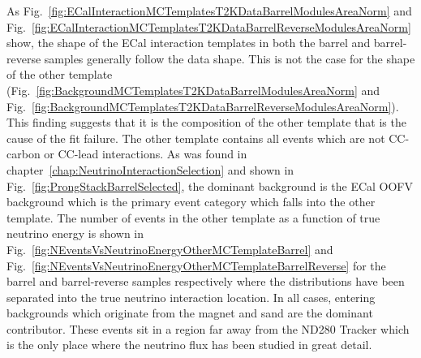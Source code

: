 As Fig.~\ref{fig:ECalInteractionMCTemplatesT2KDataBarrelModulesAreaNorm} and Fig.~\ref{fig:ECalInteractionMCTemplatesT2KDataBarrelReverseModulesAreaNorm} show, the shape of the ECal interaction templates in both the barrel and barrel-reverse samples generally follow the data shape.  This is not the case for the shape of the other template (Fig.~\ref{fig:BackgroundMCTemplatesT2KDataBarrelModulesAreaNorm} and Fig.~\ref{fig:BackgroundMCTemplatesT2KDataBarrelReverseModulesAreaNorm}).  This finding suggests that it is the composition of the other template that is the cause of the fit failure.  The other template contains all events which are not CC-carbon or CC-lead interactions.  As was found in chapter~\ref{chap:NeutrinoInteractionSelection} and shown in Fig.~\ref{fig:ProngStackBarrelSelected}, the dominant background is the ECal OOFV background which is the primary event category which falls into the other template.  The number of events in the other template as a function of true neutrino energy is shown in Fig.~\ref{fig:NEventsVsNeutrinoEnergyOtherMCTemplateBarrel} and Fig.~\ref{fig:NEventsVsNeutrinoEnergyOtherMCTemplateBarrelReverse} for the barrel and barrel-reverse samples respectively where the distributions have been separated into the true neutrino interaction location.  In all cases, entering backgrounds which originate from the magnet and sand are the dominant contributor.  These events sit in a region far away from the ND280 Tracker which is the only place where the neutrino flux has been studied in great detail. 
